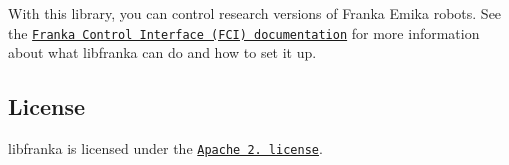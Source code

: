 With this library, you can control research versions of Franka Emika robots. See the \href{https://frankaemika.github.io/docs}{\tt Franka Control Interface (F\+CI) documentation} for more information about what {\ttfamily libfranka} can do and how to set it up.

\subsection*{License}

{\ttfamily libfranka} is licensed under the \href{https://www.apache.org/licenses/LICENSE-2.0.html}{\tt Apache 2. license}. 